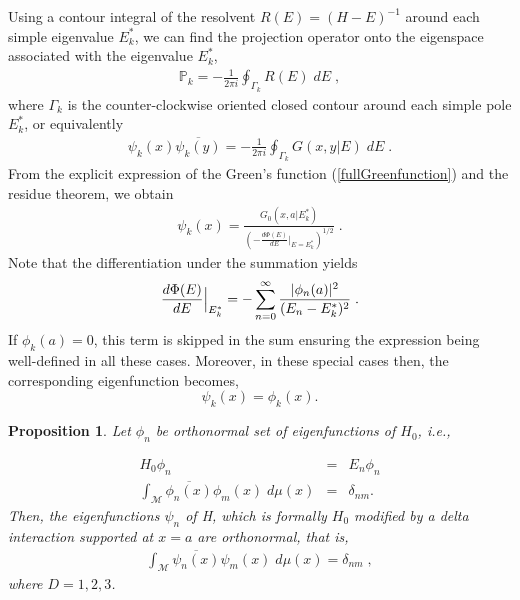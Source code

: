 \documentclass[amsmath,amssymb,14pt]{article}
\numberwithin{equation}{section}
\newtheorem{myproposition}[mytheo]{Proposition}
\begin{document}
Using a contour integral of the resolvent $R(E)=(H-E)^{-1}$ around each simple eigenvalue $E_{k}^{*}$, we can find the projection operator onto the eigenspace associated with the eigenvalue $E_{k}^{*}$,
%
\begin{eqnarray}
    \mathbb{P}_k =  -\frac{1}{2\pi i} \oint_{\Gamma_k} R(E) \; d E \;,
\end{eqnarray}
%
where $\Gamma_k$ is the counter-clockwise oriented closed contour around each simple pole $E_{k}^{*}$, or equivalently 
%
\begin{eqnarray}
    \psi_k(x) \overline{\psi_k(y)} = -\frac{1}{2\pi i} \oint_{\Gamma_k} G(x,y|E) \; d E \;. \label{Projection}
\end{eqnarray}
%
From the explicit expression of the Green's function (\ref{fullGreenfunction}) and the residue theorem, we obtain 
%
\begin{eqnarray}
    \psi_k(x)=  \frac{G_0(x,a|E_{k}^{*})}{ \left(-\frac{d \Phi(E)}{d E}\bigg|_{E=E_{k}^{*}}\right)^{1/2}} \;. \label{boundstatewavefunctionexact}
\end{eqnarray}
%
Note that the differentiation under the summation yields
\begin{equation}
    {d\Phi(E)\over dE}\Big|_{E_k^*}= - \sum_{n=0}^\infty { |\phi_n(a)|^2\over (E_n-E_k^*)^2} \;. \label{derivativePhi}
\end{equation}
%
If $\phi_k(a)=0$, this term is skipped in the sum ensuring the expression being well-defined in all these cases. Moreover, in these special cases  then, the corresponding eigenfunction becomes,
\begin{equation}
    \psi_k(x)=\phi_k(x)
.\end{equation}
\begin{myproposition} Let $\phi_n$ be orthonormal set of eigenfunctions of $H_0$, i.e., 

\begin{eqnarray}
H_0 \phi_n &=&E_n \phi_n \nonumber \\ \int_{\mathcal{M}} \overline{\phi_n(x)} \phi_m (x) \; d\mu(x) & =&  \delta_{nm}.
\end{eqnarray} 
%
Then, the eigenfunctions $\psi_n$ of H, which is formally $H_0$ modified by a delta interaction supported at $x=a$ are orthonormal, that is, 
%
\begin{eqnarray}
    \int_{\mathcal{M}} \overline{\psi_n(x)} \psi_m (x) \; d\mu( x) = \delta_{nm} \;,
\end{eqnarray}
%
where $D=1,2,3$. \end{myproposition}
\end{document}
